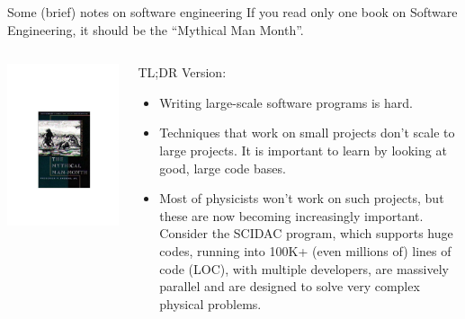 \documentclass[aspectratio=169]{beamer}
\begin{document}
\begin{frame}{Some (brief) notes on software engineering}
  \footnotesize%
  If you read only one book on Software Engineering, it
  should be the ``Mythical Man Month''.

  \begin{columns}
    \begin{column}{0.4\linewidth}
      \includegraphics[width=0.8\linewidth]{mmm.pdf}
    \end{column}
    
    \begin{column}{0.6\linewidth}
      TL;DR Version: 
      \begin{itemize}
      \item Writing large-scale software programs is hard. 
      \item Techniques that work on small projects don't scale to large
        projects. It is important to learn by looking at good, large
        code bases.
      \item Most of physicists won't work on such projects, but these
        are now becoming increasingly important. Consider the SCIDAC
        program, which supports huge codes, running into 100K+ (even
        millions of) lines of code (LOC), with multiple developers,
        are massively parallel and are designed to solve very complex
        physical problems.
      \end{itemize}
    \end{column}
  \end{columns}
    
\end{frame}
\end{document}
